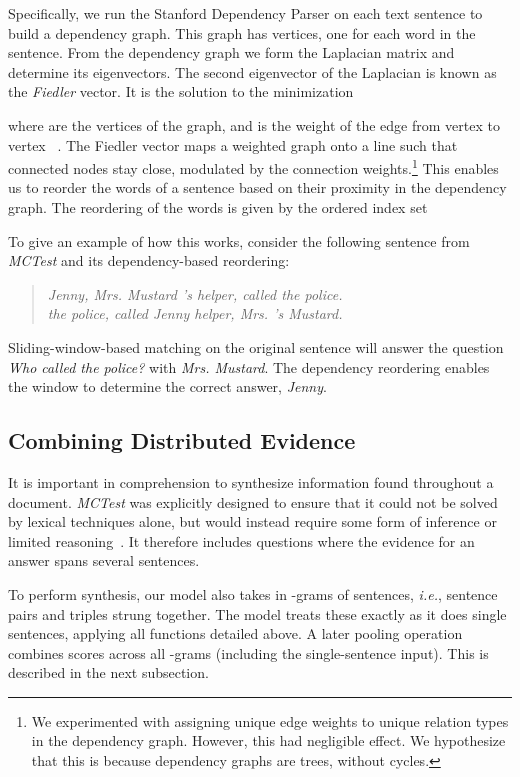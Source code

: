 \documentclass[11pt]{article}
\begin{document}
Specifically, we run the Stanford Dependency Parser on each text sentence to build a dependency graph. This graph has  vertices, one for each word in the sentence. From the dependency graph we form the Laplacian matrix  and determine its eigenvectors. The second eigenvector  of the Laplacian is known as the {\it Fiedler} vector. It is the solution to the minimization

where  are the vertices of the graph, and  is the weight of the edge from vertex  to vertex ~\cite{golub2012}. The Fiedler vector maps a weighted graph onto a line such that connected nodes stay close, modulated by the connection weights.\footnote{We experimented with assigning unique edge weights to unique relation types in the dependency graph. However, this had negligible effect. We hypothesize that this is because dependency graphs are trees, without cycles.} This enables us to reorder the words of a sentence based on their proximity in the dependency graph. The reordering of the words is given by the ordered index set


To give an example of how this works, consider the following sentence from {\it MCTest} and its dependency-based reordering:
\begin{quote}
\textsl{Jenny, Mrs. Mustard 's helper, called the police.} \\
\textsl{the police, called Jenny helper, Mrs. 's Mustard.}
\end{quote}
Sliding-window-based matching on the original sentence will answer the question \textsl{Who called the police?} with \textsl{Mrs. Mustard}. The dependency reordering enables the window to determine the correct answer, \textsl{Jenny}. 

\subsection{Combining Distributed Evidence}
It is important in comprehension to synthesize information found throughout a document. {\it MCTest} was explicitly designed to ensure that it could not be solved by lexical techniques alone, but would instead require some form of inference or limited reasoning~\cite{richardson2013}.  It therefore includes questions where the evidence for an answer spans several sentences.

To perform synthesis, our model also takes in -grams of sentences, {\it i.e.}, sentence pairs and triples strung together. The model treats these exactly as it does single sentences, applying all functions detailed above. A later pooling operation combines scores across all -grams (including the single-sentence input). This is described in the next subsection.
\end{document}
